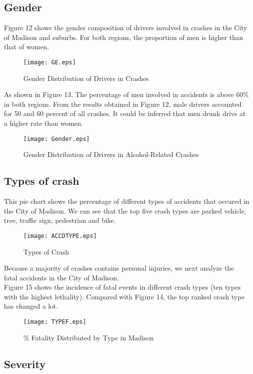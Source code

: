\documentclass[15pt]{article}
\begin{document}
\newpage
\subsection{Gender}
Figure 12 shows the gender composition of drivers involved in crashes in the City of Madison and suburbs. For both regions, the proportion of men is higher than that of women.
\begin{figure}[H]
\flushleft
\texttt{[image: GE.eps]}
\caption{Gender Distribution of Drivers in Crashes}
\label{13}
\end{figure}

\newpage
As shown in Figure 13, The percentage of men involved in accidents is above 60\% in both regions. From the results obtained in Figure 12, male drivers accounted for 50 and 60 percent of all crashes. It could be inferred that men drunk drive at a higher rate than women.
\begin{figure}[H]
\flushleft
\texttt{[image: Gender.eps]}
\caption{Gender Distribution of Drivers in Alcohol-Related Crashes}
\label{14}
\end{figure}

\newpage
\subsection{Types of crash}
This pie chart shows the percentage of different types of accidents that occured in the City of Madison. We can see that the top five crash types are parked vehicle, tree, traffic sign, pedestrian and bike.
\begin{figure}[H]
\flushleft
\texttt{[image: ACCDTYPE.eps]}
\caption{Types of Crash}
\label{15}
\end{figure}

\newpage
Because a majority of crashes contains personal injuries, we next analyze the fatal accidents in the City of Madison.\\
Figure 15 shows the incidence of fatal events in different crash types (ten types with the highest lethality). Compared with Figure 14, the top ranked crash type has changed a lot.
\begin{figure}[H]
\flushleft
\texttt{[image: TYPEF.eps]}
\caption{\% Fatality Distributed by Type in Madison}
\label{16}
\end{figure}

\newpage
\subsection{Severity}
\end{document}
